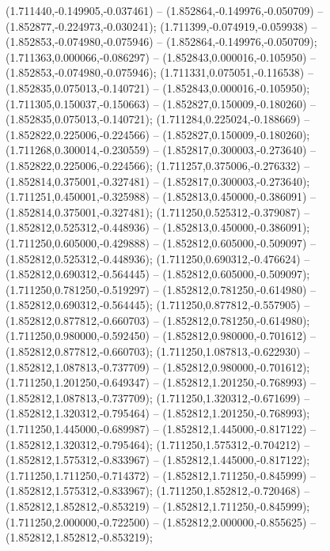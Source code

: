  (1.711440,-0.149905,-0.037461) -- (1.852864,-0.149976,-0.050709) -- (1.852877,-0.224973,-0.030241);
 (1.711399,-0.074919,-0.059938) -- (1.852853,-0.074980,-0.075946) -- (1.852864,-0.149976,-0.050709);
 (1.711363,0.000066,-0.086297) -- (1.852843,0.000016,-0.105950) -- (1.852853,-0.074980,-0.075946);
 (1.711331,0.075051,-0.116538) -- (1.852835,0.075013,-0.140721) -- (1.852843,0.000016,-0.105950);
 (1.711305,0.150037,-0.150663) -- (1.852827,0.150009,-0.180260) -- (1.852835,0.075013,-0.140721);
 (1.711284,0.225024,-0.188669) -- (1.852822,0.225006,-0.224566) -- (1.852827,0.150009,-0.180260);
 (1.711268,0.300014,-0.230559) -- (1.852817,0.300003,-0.273640) -- (1.852822,0.225006,-0.224566);
 (1.711257,0.375006,-0.276332) -- (1.852814,0.375001,-0.327481) -- (1.852817,0.300003,-0.273640);
 (1.711251,0.450001,-0.325988) -- (1.852813,0.450000,-0.386091) -- (1.852814,0.375001,-0.327481);
 (1.711250,0.525312,-0.379087) -- (1.852812,0.525312,-0.448936) -- (1.852813,0.450000,-0.386091);
 (1.711250,0.605000,-0.429888) -- (1.852812,0.605000,-0.509097) -- (1.852812,0.525312,-0.448936);
 (1.711250,0.690312,-0.476624) -- (1.852812,0.690312,-0.564445) -- (1.852812,0.605000,-0.509097);
 (1.711250,0.781250,-0.519297) -- (1.852812,0.781250,-0.614980) -- (1.852812,0.690312,-0.564445);
 (1.711250,0.877812,-0.557905) -- (1.852812,0.877812,-0.660703) -- (1.852812,0.781250,-0.614980);
 (1.711250,0.980000,-0.592450) -- (1.852812,0.980000,-0.701612) -- (1.852812,0.877812,-0.660703);
 (1.711250,1.087813,-0.622930) -- (1.852812,1.087813,-0.737709) -- (1.852812,0.980000,-0.701612);
 (1.711250,1.201250,-0.649347) -- (1.852812,1.201250,-0.768993) -- (1.852812,1.087813,-0.737709);
 (1.711250,1.320312,-0.671699) -- (1.852812,1.320312,-0.795464) -- (1.852812,1.201250,-0.768993);
 (1.711250,1.445000,-0.689987) -- (1.852812,1.445000,-0.817122) -- (1.852812,1.320312,-0.795464);
 (1.711250,1.575312,-0.704212) -- (1.852812,1.575312,-0.833967) -- (1.852812,1.445000,-0.817122);
 (1.711250,1.711250,-0.714372) -- (1.852812,1.711250,-0.845999) -- (1.852812,1.575312,-0.833967);
 (1.711250,1.852812,-0.720468) -- (1.852812,1.852812,-0.853219) -- (1.852812,1.711250,-0.845999);
 (1.711250,2.000000,-0.722500) -- (1.852812,2.000000,-0.855625) -- (1.852812,1.852812,-0.853219);
